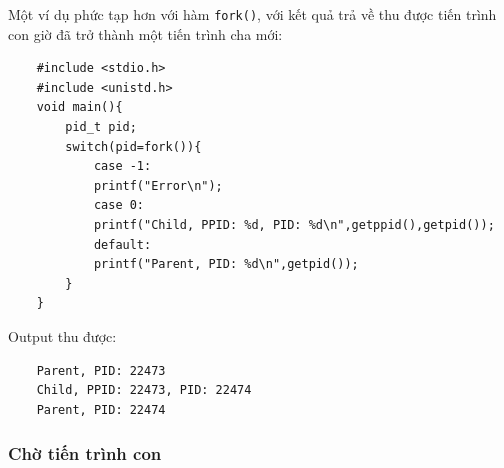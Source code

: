 \documentclass{article}
\begin{document}
Một ví dụ phức tạp hơn với hàm \verb|fork()|, với kết quả trả về thu được tiến trình con giờ đã trở thành một tiến trình cha mới:
\begin{verbatim}
    #include <stdio.h>
    #include <unistd.h>
    void main(){
        pid_t pid;
        switch(pid=fork()){
            case -1:
            printf("Error\n");
            case 0:
            printf("Child, PPID: %d, PID: %d\n",getppid(),getpid());
            default:
            printf("Parent, PID: %d\n",getpid());
        }
    }    
\end{verbatim}
Output thu được:
\begin{verbatim}
    Parent, PID: 22473
    Child, PPID: 22473, PID: 22474
    Parent, PID: 22474
\end{verbatim}
\subsubsection{Chờ tiến trình con}
\end{document}

